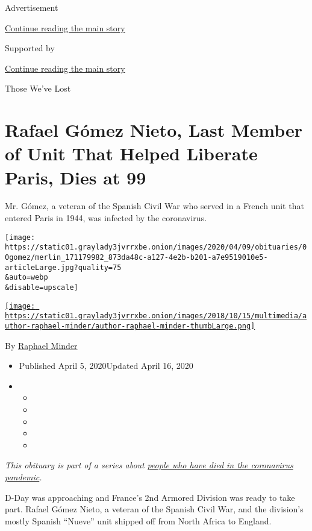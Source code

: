 Advertisement

\protect\hyperlink{after-top}{Continue reading the main story}

Supported by

\protect\hyperlink{after-sponsor}{Continue reading the main story}

Those We've Lost

\hypertarget{rafael-guxf3mez-nieto-last-member-of-unit-that-helped-liberate-paris-dies-at-99}{%
\section{Rafael Gómez Nieto, Last Member of Unit That Helped Liberate
Paris, Dies at
99}\label{rafael-guxf3mez-nieto-last-member-of-unit-that-helped-liberate-paris-dies-at-99}}

Mr. Gómez, a veteran of the Spanish Civil War who served in a French
unit that entered Paris in 1944, was infected by the coronavirus.

\texttt{[image: https://static01.graylady3jvrrxbe.onion/images/2020/04/09/obituaries/00gomez/merlin\_171179982\_873da48c-a127-4e2b-b201-a7e9519010e5-articleLarge.jpg?quality=75\\\&auto=webp\\\&disable=upscale]}

\href{https://www.nytimes3xbfgragh.onion/by/raphael-minder}{\texttt{[image: https://static01.graylady3jvrrxbe.onion/images/2018/10/15/multimedia/author-raphael-minder/author-raphael-minder-thumbLarge.png]}}

By \href{https://www.nytimes3xbfgragh.onion/by/raphael-minder}{Raphael
Minder}

\begin{itemize}
\item
  Published April 5, 2020Updated April 16, 2020
\item
  \begin{itemize}
  \item
  \item
  \item
  \item
  \item
  \end{itemize}
\end{itemize}

\emph{This obituary is part of a series about}
\href{https://www.nytimes3xbfgragh.onion/series/people-who-have-died-of-the-coronavirus}{\emph{people
who have died in the coronavirus pandemic}}\emph{.}

D-Day was approaching and France's 2nd Armored Division was ready to
take part. Rafael Gómez Nieto, a veteran of the Spanish Civil War, and
the division's mostly Spanish ``Nueve'' unit shipped off from North
Africa to England.

